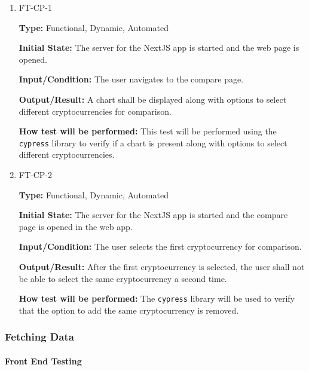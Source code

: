 \documentclass[12pt, titlepage]{article}
\begin{document}
\begin{enumerate}
\item{FT-CP-1}

\textbf{Type:} Functional, Dynamic, Automated
					
\textbf{Initial State:} The server for the NextJS app is started and the web page is opened.
					
\textbf{Input/Condition:} The user navigates to the compare page.
					
\textbf{Output/Result:} A chart shall be displayed along with options to select different cryptocurrencies for comparison.
					
\textbf{How test will be performed:} This test will be performed using the \texttt{cypress} library to verify if a chart is present along with options to select different cryptocurrencies.

\item{FT-CP-2}

\textbf{Type:} Functional, Dynamic, Automated
					
\textbf{Initial State:} The server for the NextJS app is started and the compare page is opened in the web app.
					
\textbf{Input/Condition:} The user selects the first cryptocurrency for comparison.
					
\textbf{Output/Result:} After the first cryptocurrency is selected, the user shall not be able to select the same cryptocurrency a second time. 
					
\textbf{How test will be performed:} The \texttt{cypress} library will be used to verify that the option to add the same cryptocurrency is removed.

\end{enumerate}

\subsubsection{Fetching Data}
		
\paragraph{Front End Testing}
\end{document}
